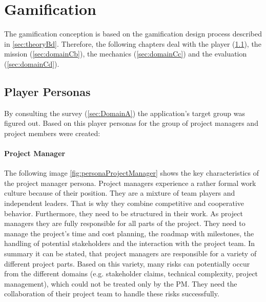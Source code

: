 \newpage

\section{Gamification}
\label{sec:domainC}


The gamification conception is based on the gamification design process described in \ref{sec:theoryBd}. Therefore, the following chapters deal with the player (\ref{sec:domainCa}), the mission (\ref{sec:domainCb}), the mechanics (\ref{sec:domainCc}) and the evaluation (\ref{sec:domainCd}).

\subsection{Player Personas}
\label{sec:domainCa}
By consulting the survey (\ref{sec:DomainA}) the application's target group was figured out. Based on this player personas for the group of project managers and project members were created:

\paragraph*{Project Manager}

The following image \ref{fig:personaProjectManager} shows the key characteristics of the project manager persona.
Project managers experience a rather formal work culture because of their position. They are a mixture of team players and independent leaders. That is why they combine competitive and cooperative behavior. Furthermore, they need to be structured in their work.
As project managers they are fully responsible for all parts of the project. They need to manage the project's time and cost planning, the roadmap with milestones, the handling of potential stakeholders and the interaction with the project team. In summary it can be stated, that project managers are responsible for a variety of different project parts. Based on this variety, many risks can potentially occur from the different domains (e.g. stakeholder claims, technical complexity, project management), which could not be treated only by the PM. They need the collaboration of their project team to handle these risks successfully.

